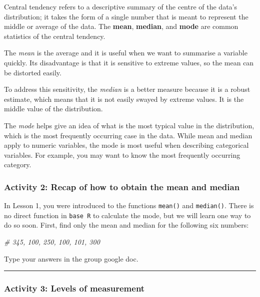 \documentclass[
]{book}
\newenvironment{Shaded}{\begin{snugshade}}{\end{snugshade}}
\newcommand{\CommentTok}[1]{\textcolor[rgb]{0.56,0.35,0.01}{\textit{#1}}}
\begin{document}
Central tendency refers to a descriptive summary of the centre of the data's distribution; it takes the form of a single number that is meant to represent the middle or average of the data. The \textbf{mean}, \textbf{median}, and \textbf{mode} are common statistics of the central tendency.

The \emph{mean} is the average and it is useful when we want to summarise a variable quickly. Its disadvantage is that it is sensitive to extreme values, so the mean can be distorted easily.

To address this sensitivity, the \emph{median} is a better measure because it is a robust estimate, which means that it is not easily swayed by extreme values. It is the middle value of the distribution.

The \emph{mode} helps give an idea of what is the most typical value in the distribution, which is the most frequently occurring case in the data. While mean and median apply to numeric variables, the mode is most useful when describing categorical variables. For example, you may want to know the most frequently occurring category.

\hypertarget{activity-2-recap-of-how-to-obtain-the-mean-and-median}{%
\subsubsection{Activity 2: Recap of how to obtain the mean and median}\label{activity-2-recap-of-how-to-obtain-the-mean-and-median}}

In Lesson 1, you were introduced to the functions \texttt{mean()} and \texttt{median()}. There is no direct function in \texttt{base\ R} to calculate the mode, but we will learn one way to do so soon. First, find only the mean and median for the following six numbers:

\begin{Shaded}
\begin{Highlighting}[]
\CommentTok{\# 345, 100, 250, 100, 101, 300 }
\end{Highlighting}
\end{Shaded}

Type your answers in the group google doc.

\begin{center}\rule{0.5\linewidth}{0.5pt}\end{center}

\hypertarget{activity-3-levels-of-measurement}{%
\subsubsection{Activity 3: Levels of measurement}\label{activity-3-levels-of-measurement}}
\end{document}
